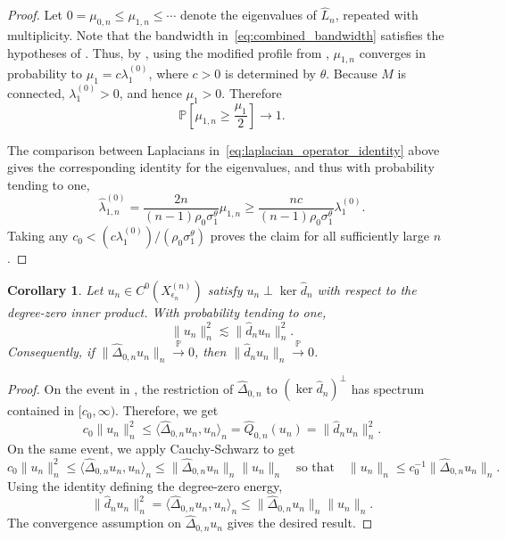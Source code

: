 \documentclass[11pt,reqno]{amsproc}
\numberwithin{equation}{section}
\newcommand{\PP}{\mathbb{P}}
\newcommand{\hd}{\hat{d}}
\newcommand{\ls}{\lesssim}
\newtheorem{corollary}[counter]{Corollary}
\theoremstyle{definition}
\theoremstyle{plain}
\begin{document}
    \begin{proof}
    Let $0=\mu_{0,n}\leq\mu_{1,n}\leq\cdots$ denote the eigenvalues of $\hat{L}_n$, repeated with multiplicity. Note that the bandwidth in~\eqref{eq:combined_bandwidth} satisfies the hypotheses of \cite[Theorem~2.4]{calder_improved_2022}. Thus, by \cite[Theorem~2.4]{calder_improved_2022}, using the modified profile from , $\mu_{1,n}$ converges in probability to $\mu_1=c\lambda_1^{(0)}$, where $c>0$ is determined by $\theta$. Because $M$ is connected, $\lambda_1^{(0)}>0$, and hence $\mu_1>0$. Therefore
    \[
        \PP\left[\mu_{1,n}\geq \frac{\mu_1}{2}\right]\to 1.
    \]

    The comparison between Laplacians in~\eqref{eq:laplacian_operator_identity} above gives the corresponding identity for the eigenvalues, and thus with probability tending to one, 
    \begin{equation}
        \widehat\lambda^{(0)}_{1,n}= \frac{2n}{(n-1)\rho_0\sigma_1^\theta}\mu_{1,n} \geq \frac{nc}{(n-1)\rho_0\sigma_1^\theta}\lambda_1^{(0)}.
    \end{equation}
    Taking any $c_0<(c\lambda_1^{(0)})/(\rho_0\sigma_1^\theta)$ proves the claim for all sufficiently large $n$.
    \end{proof}

    \begin{corollary} \label{cor:laplacian_implies_diff_convergence_sec7}
    Let $u_n\in C^0(X^{(n)}_{\epsilon_n})$ satisfy $u_n\perp \ker \hd_n$ with respect to the degree-zero inner product.  With probability tending to one,
    \[
        \|u_n\|_n^2 \ls \|\hd_n u_n\|_n^2.
    \]
    Consequently, if $\|\widehat\Delta_{0,n}u_n\|_n\xrightarrow{\PP}0$, then $\|\hd_n u_n\|_n\xrightarrow{\PP}0$.
    \end{corollary}

    \begin{proof}
    On the event in , the restriction of $\widehat\Delta_{0,n}$ to $(\ker\hd_n)^\perp$ has spectrum contained in $[c_0,\infty)$.  Therefore, we get
    \begin{equation}
        c_0\|u_n\|_n^2
        \leq
        \langle \widehat\Delta_{0,n}u_n,u_n\rangle_n
        = \widehat Q_{0,n}(u_n)
        =
        \|\hd_n u_n\|_n^2.
    \end{equation}
    On the same event, we apply Cauchy-Schwarz to get
    \begin{equation}
        c_0\|u_n\|_n^2 \leq \langle \widehat\Delta_{0,n}u_n,u_n\rangle_n \leq \|\widehat\Delta_{0,n}u_n\|_n \|u_n\|_n \quad \text{so that} \quad \|u_n\|_n\leq c_0^{-1}\|\widehat\Delta_{0,n}u_n\|_n.
    \end{equation}
    Using the identity defining the degree-zero energy,
    \[
        \|\hd_n u_n\|_n^2
        =
        \langle \widehat\Delta_{0,n}u_n,u_n\rangle_n
        \leq
        \|\widehat\Delta_{0,n}u_n\|_n\|u_n\|_n.
    \]
    The convergence assumption on $\widehat\Delta_{0,n}u_n$ gives the desired result.
    \end{proof}
\end{document}
